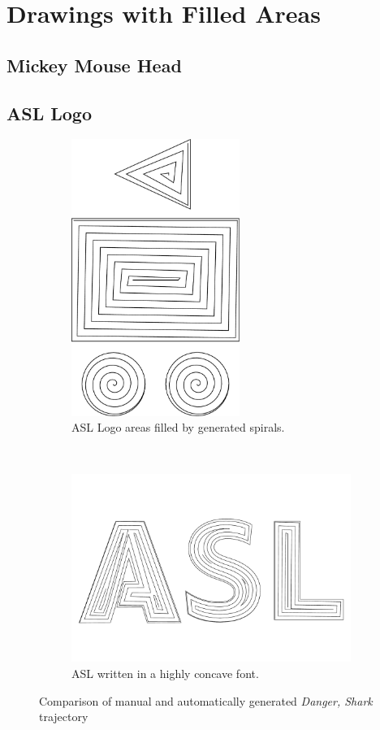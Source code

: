 \section{Drawings with Filled Areas}
\subsection{Mickey Mouse Head}
\subsection{ASL Logo}

\begin{figure}[h]
\centering
\begin{subfigure}[t]{0.95\textwidth}
\centering
	\includegraphics[height=9cm]{images/results/asl/asl_logo_spiral.pdf}
	\caption{ASL Logo areas filled by generated spirals.}
\end{subfigure}\\
\begin{subfigure}[t]{0.95\textwidth}
	\includegraphics[width=\textwidth]{images/results/asl/asl_font.pdf}
	\caption{ASL written in a highly concave font.}
\end{subfigure}
\caption{Comparison of manual and automatically generated \textit{Danger, Shark} trajectory}
\end{figure}

